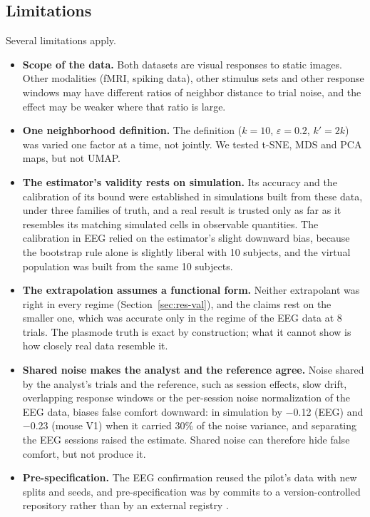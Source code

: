 \documentclass[11pt]{article}
\newcommand{\ValDepEeg}{$-$0.12}
\newcommand{\ValDepMouse}{$-$0.23}
\begin{document}
\subsection{Limitations}

Several limitations apply.
\begin{itemize}[leftmargin=*]
  \item \textbf{Scope of the data.} Both datasets are visual responses to static images.
  Other modalities (fMRI, spiking data), other stimulus sets and other response windows may have different ratios of neighbor distance to trial noise, and the effect may be weaker where that ratio is large.
  \item \textbf{One neighborhood definition.} The definition ($k=10$, $\varepsilon=0.2$, $k'=2k$) was varied one factor at a time, not jointly.
  We tested t-SNE, MDS and PCA maps, but not UMAP.
  \item \textbf{The estimator's validity rests on simulation.} Its accuracy and the calibration of its bound were established in simulations built from these data, under three families of truth, and a real result is trusted only as far as it resembles its matching simulated cells in observable quantities.
  The calibration in EEG relied on the estimator's slight downward bias, because the bootstrap rule alone is slightly liberal with 10 subjects, and the virtual population was built from the same 10 subjects.
  \item \textbf{The extrapolation assumes a functional form.} Neither extrapolant was right in every regime (Section~\ref{sec:res-val}), and the claims rest on the smaller one, which was accurate only in the regime of the EEG data at 8 trials.
  The plasmode truth is exact by construction; what it cannot show is how closely real data resemble it.
  \item \textbf{Shared noise makes the analyst and the reference agree.} Noise shared by the analyst's trials and the reference, such as session effects, slow drift, overlapping response windows or the per-session noise normalization of the EEG data, biases false comfort downward: in simulation by \ValDepEeg{} (EEG) and \ValDepMouse{} (mouse V1) when it carried 30\% of the noise variance, and separating the EEG sessions raised the estimate.
  Shared noise can therefore hide false comfort, but not produce it.
  \item \textbf{Pre-specification.} The EEG confirmation reused the pilot's data with new splits and seeds, and pre-specification was by commits to a version-controlled repository rather than by an external registry \citep{nosek2018}.

\end{itemize}
\end{document}
